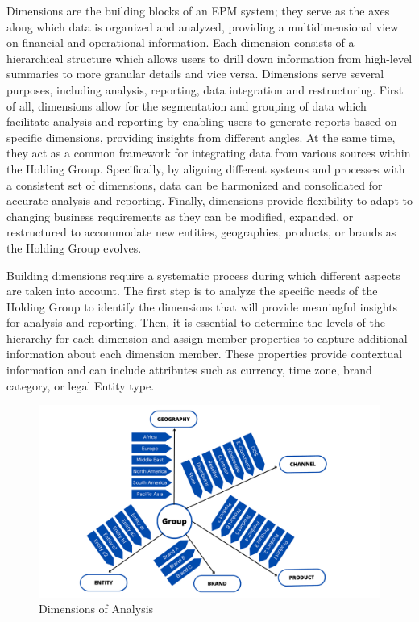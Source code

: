 \documentclass[12pt,a4paper,openright,twoside]{book}
\begin{document}
Dimensions are the building blocks of an EPM system; they serve as the axes along which data is organized and analyzed, providing a multidimensional view on financial and operational information. 
%
Each dimension consists of a hierarchical structure which allows users to drill down information from high-level summaries to more granular details and vice versa.
%
Dimensions serve several purposes, including analysis, reporting, data integration and restructuring.
%
First of all, dimensions allow for the segmentation and grouping of data which facilitate analysis and reporting by enabling users to generate reports based on specific dimensions, providing insights from different angles.
%
At the same time, they act as a common framework for integrating data from various sources within the Holding Group. 
%
Specifically, by aligning different systems and processes with a consistent set of dimensions, data can be harmonized and consolidated for accurate analysis and reporting.
%
Finally, dimensions provide flexibility to adapt to changing business requirements as they can be modified, expanded, or restructured to accommodate new entities, geographies, products, or brands as the Holding Group evolves.

Building dimensions require a systematic process during which different aspects are taken into account.
%
The first step is to analyze the specific needs of the Holding Group to identify the dimensions that will provide meaningful insights for analysis and reporting.
%
Then, it is essential to determine the levels of the hierarchy for each dimension and assign member properties to capture additional information about each dimension member. 
%
These properties provide contextual information and can include attributes such as currency, time zone, brand category, or legal Entity type. \\

\begin{figure}[htbp]
	\centering
	\includegraphics[width=\linewidth]{figures/dimensions.pdf}
	\caption{Dimensions of Analysis}
	\label{fig:dimensions}
\end{figure}
\end{document}
